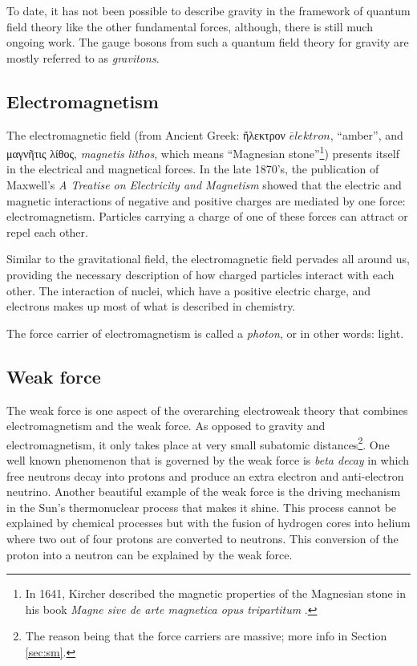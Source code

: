 To date, it has not been possible to describe gravity in the framework of quantum field theory like the other fundamental forces, although, there is still much ongoing work. The gauge bosons from such a quantum field theory for gravity are mostly referred to as \textit{gravitons}.

\subsection{Electromagnetism}
The electromagnetic field (from Ancient Greek: \gr ἤλεκτρον \en $\bar{e}lektron$, ``amber'', and \gr μαγνῆτις λίθος, \en \textit{magnetis lithos}, which means ``Magnesian stone''\footnote{In 1641, Kircher described the magnetic properties of the Magnesian stone in his book \textit{Magne sive de arte magnetica opus tripartitum} \cite{kircher1641athanasii}.}) presents itself in the electrical and magnetical forces. In the late 1870's, the publication of Maxwell's \textit{A Treatise on Electricity and Magnetism} showed that the electric and magnetic interactions of negative and positive charges are mediated by one force: electromagnetism. Particles carrying a charge of one of these forces can attract or repel each other.

Similar to the gravitational field, the electromagnetic field pervades all around us, providing the necessary description of how charged particles interact with each other. The interaction of nuclei, which have a positive electric charge, and electrons makes up most of what is described in chemistry. 

The force carrier of electromagnetism is called a \textit{photon}, or in other words: light.
\subsection{Weak force}
\label{subsec:weak}
The weak force is one aspect of the overarching electroweak theory that combines electromagnetism and the weak force. As opposed to gravity and electromagnetism, it only takes place at very small subatomic distances\footnote{The reason being that the force carriers are massive; more info in Section \ref{sec:sm}.}. One well known phenomenon that is governed by the weak force is \textit{beta decay} in which free neutrons decay into protons and produce an extra electron and anti-electron neutrino. Another beautiful example of the weak force is the driving mechanism in the Sun's thermonuclear process that makes it shine. This process cannot be explained by chemical processes but with the fusion of hydrogen cores into helium where two out of four protons are converted to neutrons. This conversion of the proton into a neutron can be explained by the weak force.

